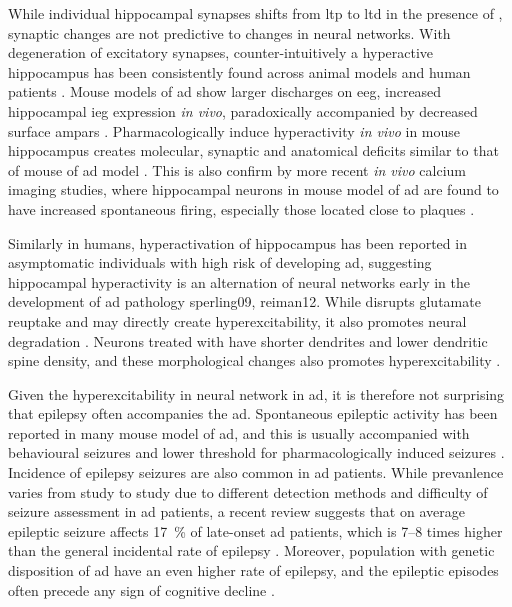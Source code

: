 While individual hippocampal synapses shifts from \gls{ltp} to \gls{ltd} in the presence of \abeta{}, synaptic changes are not predictive to changes in neural networks. With degeneration of excitatory synapses, counter-intuitively a hyperactive hippocampus has been consistently found across animal models and human patients \citep{palop16}. Mouse models of \gls{ad} show larger discharges on \gls{eeg}, increased hippocampal \gls{ieg} expression \textit{in vivo}, paradoxically accompanied by decreased surface \glspl{ampar} \citep{palop07, harris10, born14}. Pharmacologically induce hyperactivity \textit{in vivo} in mouse hippocampus creates molecular, synaptic and anatomical deficits similar to that of mouse of \gls{ad} model \citep{palop07}. This is also confirm by more recent \textit{in vivo} calcium imaging studies, where hippocampal neurons in mouse model of \gls{ad} are found to have increased spontaneous firing, especially those located close to plaques \citep{busche12}. 

Similarly in humans, hyperactivation of hippocampus has been reported in asymptomatic individuals with high risk of developing \gls{ad}, suggesting hippocampal hyperactivity is an alternation of neural networks early in the development of \gls{ad} pathology {sperling09, reiman12}. While \abeta{} disrupts glutamate reuptake and may directly create hyperexcitability, it also promotes neural degradation \citep{spires04, koffie09}. Neurons treated with \abeta{} have shorter dendrites and lower dendritic spine density, and these morphological changes also promotes hyperexcitability \citep{siskova14}.

Given the hyperexcitability in neural network in \gls{ad}, it is therefore not surprising that epilepsy often accompanies the \gls{ad}. Spontaneous epileptic activity has been reported in many mouse model of \gls{ad}, and this is usually accompanied with behavioural seizures and lower threshold for pharmacologically induced seizures \citep{palop07, um12, ittner10}. Incidence of epilepsy seizures are also common in \gls{ad} patients. While prevanlence varies from study to study due to different detection methods and difficulty of seizure assessment in \gls{ad} patients, a recent review suggests that on average epileptic seizure affects \SI{17}{\percent} of late-onset \gls{ad} patients, which is 7--8 times higher than the general incidental rate of epilepsy \citep{amatniek06, horvath16}. Moreover, population with genetic disposition of \gls{ad} have an even higher rate of epilepsy, and the epileptic episodes often precede any sign of cognitive decline \citep{moehlmann02,cabrejo06,mcnaughton12}. 

